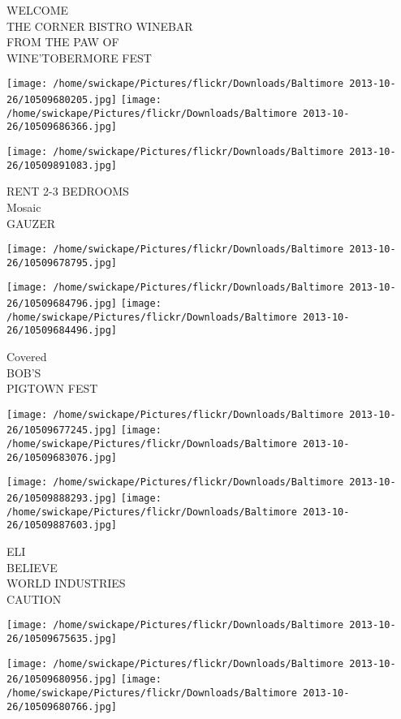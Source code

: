 \documentclass[10pt,letterpaper]{article}
\begin{document}
WELCOME\\
THE CORNER BISTRO WINEBAR\\
FROM THE PAW OF\\
WINE'TOBERMORE FEST
\pagebreak

\texttt{[image: /home/swickape/Pictures/flickr/Downloads/Baltimore 2013-10-26/10509680205.jpg]}
\texttt{[image: /home/swickape/Pictures/flickr/Downloads/Baltimore 2013-10-26/10509686366.jpg]}

\texttt{[image: /home/swickape/Pictures/flickr/Downloads/Baltimore 2013-10-26/10509891083.jpg]}

RENT 2{-}3 BEDROOMS\\
Mosaic\\
GAUZER
\pagebreak

\texttt{[image: /home/swickape/Pictures/flickr/Downloads/Baltimore 2013-10-26/10509678795.jpg]}

\vspace{0.25in}
\texttt{[image: /home/swickape/Pictures/flickr/Downloads/Baltimore 2013-10-26/10509684796.jpg]}
\texttt{[image: /home/swickape/Pictures/flickr/Downloads/Baltimore 2013-10-26/10509684496.jpg]}

Covered\\
BOB'S\\
PIGTOWN FEST
\pagebreak

\texttt{[image: /home/swickape/Pictures/flickr/Downloads/Baltimore 2013-10-26/10509677245.jpg]}
\texttt{[image: /home/swickape/Pictures/flickr/Downloads/Baltimore 2013-10-26/10509683076.jpg]}

\texttt{[image: /home/swickape/Pictures/flickr/Downloads/Baltimore 2013-10-26/10509888293.jpg]}
\texttt{[image: /home/swickape/Pictures/flickr/Downloads/Baltimore 2013-10-26/10509887603.jpg]}

ELI\\
BELIEVE\\
WORLD INDUSTRIES\\
CAUTION
\pagebreak

\texttt{[image: /home/swickape/Pictures/flickr/Downloads/Baltimore 2013-10-26/10509675635.jpg]}

\vspace{0.25in}
\texttt{[image: /home/swickape/Pictures/flickr/Downloads/Baltimore 2013-10-26/10509680956.jpg]}
\texttt{[image: /home/swickape/Pictures/flickr/Downloads/Baltimore 2013-10-26/10509680766.jpg]}
\end{document}
